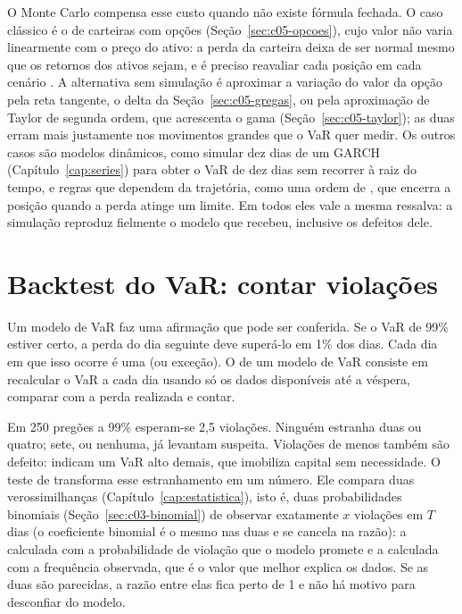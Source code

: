 O Monte Carlo compensa esse custo quando não existe fórmula fechada. O caso clássico é o de carteiras com opções (Seção~\ref{sec:c05-opcoes}), cujo valor não varia linearmente com o preço do ativo: a perda da carteira deixa de ser normal mesmo que os retornos dos ativos sejam, e é preciso reavaliar cada posição em cada cenário \citep{hull2018, jorion2007}. A alternativa sem simulação é aproximar a variação do valor da opção pela reta tangente, o delta da Seção~\ref{sec:c05-gregas}, ou pela aproximação de Taylor de segunda ordem, que acrescenta o gama (Seção~\ref{sec:c05-taylor}); as duas erram mais justamente nos movimentos grandes que o VaR quer medir. Os outros casos são modelos dinâmicos, como simular dez dias de um GARCH (Capítulo~\ref{cap:series}) para obter o VaR de dez dias sem recorrer à raiz do tempo, e regras que dependem da trajetória, como uma ordem de , que encerra a posição quando a perda atinge um limite. Em todos eles vale a mesma ressalva: a simulação reproduz fielmente o modelo que recebeu, inclusive os defeitos dele.

\section{Backtest do VaR: contar violações}
\label{sec:c07-backtest}

Um modelo de VaR faz uma afirmação que pode ser conferida. Se o VaR de 99\% estiver certo, a perda do dia seguinte deve superá-lo em 1\% dos dias. Cada dia em que isso ocorre é uma  (ou exceção). O  de um modelo de VaR consiste em recalcular o VaR a cada dia usando só os dados disponíveis até a véspera, comparar com a perda realizada e contar.

Em 250 pregões a 99\% esperam-se 2,5 violações. Ninguém estranha duas ou quatro; sete, ou nenhuma, já levantam suspeita. Violações de menos também são defeito: indicam um VaR alto demais, que imobiliza capital sem necessidade. O teste de \citet{kupiec1995} transforma esse estranhamento em um número. Ele compara duas verossimilhanças (Capítulo~\ref{cap:estatistica}), isto é, duas probabilidades binomiais (Seção~\ref{sec:c03-binomial}) de observar exatamente $x$ violações em $T$ dias (o coeficiente binomial é o mesmo nas duas e se cancela na razão): a calculada com a probabilidade de violação que o modelo promete e a calculada com a frequência observada, que é o valor que melhor explica os dados. Se as duas são parecidas, a razão entre elas fica perto de 1 e não há motivo para desconfiar do modelo.

